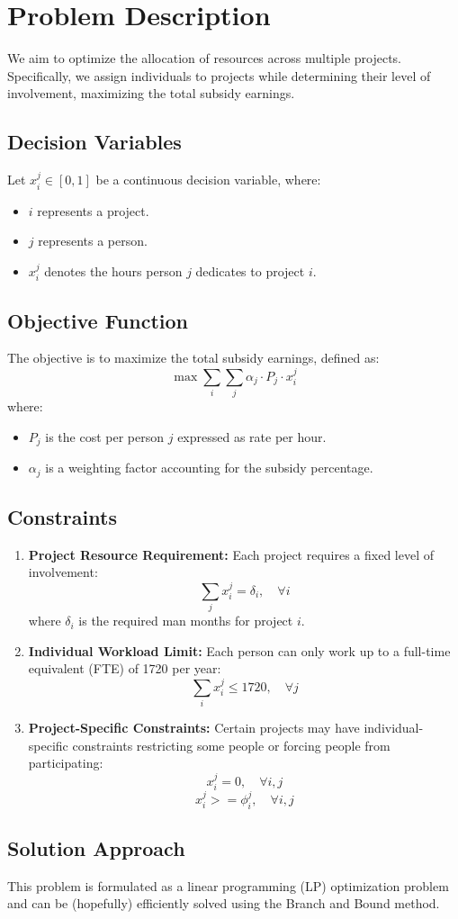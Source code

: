 \documentclass{article}
\begin{document}
	
	\section*{Problem Description}
	
	We aim to optimize the allocation of resources across multiple projects. Specifically, we assign individuals to projects while determining their level of involvement, maximizing the total subsidy earnings.

	
	\subsection*{Decision Variables}
	Let \( x_i^j \in [0,1] \) be a continuous decision variable, where:
	\begin{itemize}
		\item \( i \) represents a project.
		\item \( j \) represents a person.
		\item \( x_i^j \) denotes the hours person \( j \) dedicates to project \( i \).
	\end{itemize}
	
	\subsection*{Objective Function}
	The objective is to maximize the total subsidy earnings, defined as:
	\[
	\max \sum_{i} \sum_{j} \alpha_j  \cdot P_j\cdot x_i^j
	\]
	where:
	\begin{itemize}
		\item \( P_j \) is the cost per person $j$ expressed as rate per hour.
		\item \( \alpha_j \) is a weighting factor accounting for the subsidy percentage.
	\end{itemize}
	
	\subsection*{Constraints}
	\begin{enumerate}
		\item \textbf{Project Resource Requirement:  }
		Each project requires a fixed level of involvement:
		\[
		\sum_j x_i^j  = \delta_i, \quad \forall i
		\]
		where \( \delta_i \) is the required man months for project \( i \).
	
	    \item \textbf{Individual Workload Limit:  }
		Each person can only work up to a full-time equivalent (FTE) of 1720 per year:
		\[
		\sum_i x_i^j \leq 1720, \quad \forall j
		\]
		
		\item \textbf{Project-Specific Constraints:  }
		Certain projects may have individual-specific constraints restricting some people or forcing people from participating:
		\[
		x_i^j = 0, \quad \forall i, j
		\]
		\[
		x_i^j >= \phi_i^j, \quad \forall i, j
		\]
		
\end{enumerate}

\subsection*{Solution Approach}
This problem is formulated as a linear programming (LP) optimization problem and can be (hopefully) efficiently solved using the Branch and Bound method.

	
\end{document}
